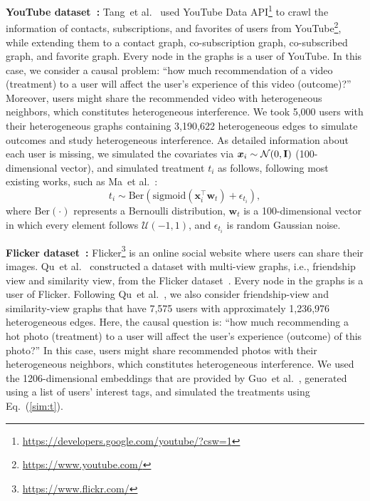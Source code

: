 \documentclass[runningheads]{llncs}
\newcommand{\etal}{{et al.}}
\begin{document}
\noindent\textbf{YouTube dataset~\cite{tang2009uncoverning}:} 
 Tang~\etal~\cite{tang2009uncoverning} used YouTube Data
API\footnote{\url{https://developers.google.com/youtube/?csw=1}} to crawl the information of contacts, subscriptions, and favorites of users from YouTube\footnote{\url{https://www.youtube.com/}}, while extending them to a contact graph, co-subscription graph,  co-subscribed graph, and favorite graph. Every node in the graphs is a user of YouTube. In this case, we consider a causal problem:  “how much recommendation of a video (treatment) to a user will affect the user's experience of this video (outcome)?” Moreover, users might share the recommended video with heterogeneous neighbors, which constitutes heterogeneous interference. We took 5,000 users with their heterogeneous graphs containing 3,190,622 heterogeneous edges to simulate outcomes and study heterogeneous interference.
As detailed information about each user is missing, we simulated the covariates via $\boldsymbol{x}_i\sim\mathcal{N}(0,\bold{I})$ (100-dimensional vector), and simulated treatment $t_i$ as follows,  following most existing works, such as Ma~\etal~\cite{ma2022learning}:
\begin{equation} \label{sim:t}
t_i\sim \text{Ber}(\text{sigmoid}(\boldsymbol{x}_i^{\top}\boldsymbol{w}_t)+\epsilon_{t_i}),
\end{equation}
where $\text{Ber}(\cdot)$ represents a Bernoulli distribution, $\boldsymbol{w}_t$ is a 100-dimensional vector in which every element follows $\mathcal{U}(-1,1)$, and $\epsilon_{t_i}$ is random Gaussian noise.

\noindent\textbf{Flicker dataset~\cite{wang2013learning}:} 
 Flicker\footnote{\url{https://www.flickr.com/}} is an online social website where users can share their images. Qu~\etal~\cite{qu2017attention} constructed a dataset with multi-view graphs, i.e., friendship view and similarity view, from the Flicker dataset~\cite{wang2013learning}. 
 Every node in the graphs is a user of Flicker. Following Qu~\etal~\cite{qu2017attention}, we also consider friendship-view and similarity-view graphs that have 7,575 users with approximately 1,236,976 heterogeneous edges.
Here, the causal question is: “how much  recommending a hot photo (treatment) to a user will affect the user's experience  (outcome) of this photo?” In this case, users might share recommended photos with their heterogeneous neighbors, which constitutes heterogeneous interference.
We used the 1206-dimensional embeddings that are provided by Guo~\etal~\cite{guo2020learning},  generated using a list of users' interest tags, and simulated the treatments using Eq.~(\ref{sim:t}).
\end{document}
